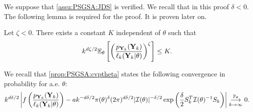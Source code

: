 \begin{proofb}
    We suppose that \cref{assu:PSGSA:JDS} is verified. We recall that in this proof $\delta<0$. The following lemma is required for the proof. It is proven later on.
    \begin{lem}
        \label{lem:dfbeta}
            Let $\zeta<0$. 
            There exists a constant $K$ independent of $\theta$ such that
                \begin{equation}
                    k^{d\zeta/2}\EE_\theta \left[\left(\frac{p_{\mbf Y_k}(\mbf Y_k)}{\ell_k(\mbf Y_k|\theta)}\right)^\zeta \right]\leq  K.
                \end{equation}
        \end{lem}

        We recall that \cref{prop:PSGSA:cvptheta} states the following convergence in probability for a.e. $\theta$:
\begin{equation}
    k^{d\delta/2}\left|f\left(\frac{p_{\mbf Y_k}(\mbf Y_k)}{\ell_k(\mbf Y_k|\theta)}\right)  - a k^{-d\delta/2}\pi(\theta)^\delta(2\pi)^{d\delta/2}|\cI(\theta)|^{-\delta/2}\exp\left(\frac{\delta}{2} S_k^T\cI(\theta)^{-1}S_k \right)  \right|
        \conv[\PP_\theta]{k\rightarrow\infty}0.
\end{equation}


\end{proofb}
